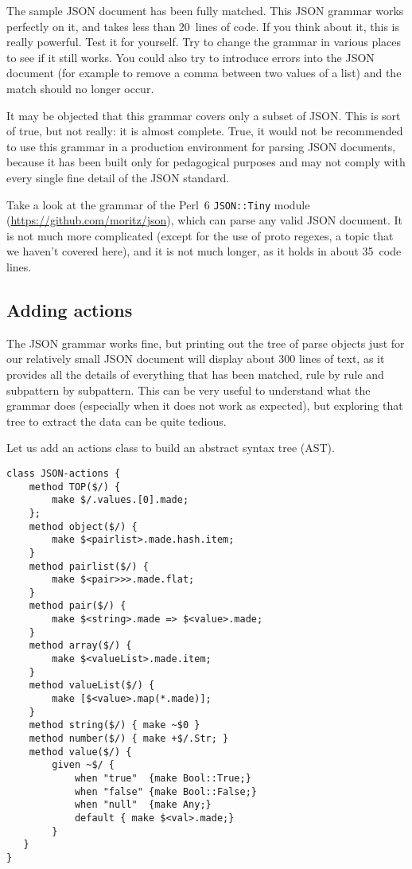The sample JSON document has been fully matched. This 
JSON grammar works perfectly on it, and takes less than 
20~lines of code. If you think about it, this is 
really powerful. Test it for yourself. Try to change 
the grammar in various places to see if it still works. 
You could also try to introduce errors into the JSON 
document (for example to remove a comma between two values 
of a list) and the match should no longer occur.

It may be objected that this grammar covers only a subset 
of JSON. This is sort of true, but not really: it is almost complete. 
True, it would not be recommended to use this grammar 
in a production environment for parsing JSON documents, 
because it has been built only for pedagogical purposes 
and may not comply with every single fine detail of the JSON 
standard.

Take a look at the grammar of the Perl~6 {\tt JSON::Tiny} 
module (\url{https://github.com/moritz/json}), which can 
parse any valid JSON document. It is not much more 
complicated (except for the use of proto regexes, a topic 
that we haven't covered here), and it is not much longer, 
as it holds in about 35~code lines.

\subsection{Adding actions}

The JSON grammar works fine, but printing out the tree of 
parse objects just for our relatively small JSON document 
will display about 300 lines of text, as 
it provides all the details of everything that has been 
matched, rule by rule and subpattern by subpattern. This 
can be very useful to understand what the grammar does 
(especially when it does not work as expected), but 
exploring that tree to extract the data can be quite tedious.

Let us add an actions class to build an abstract syntax tree 
(AST).

\begin{verbatim}
class JSON-actions {
    method TOP($/) {
        make $/.values.[0].made;
    };
    method object($/) {
        make $<pairlist>.made.hash.item;
    }
    method pairlist($/) {
        make $<pair>>>.made.flat;
    }
    method pair($/) {
        make $<string>.made => $<value>.made;
    }
    method array($/) {
        make $<valueList>.made.item;
    }
    method valueList($/) {
        make [$<value>.map(*.made)];
    }
    method string($/) { make ~$0 }
    method number($/) { make +$/.Str; }
    method value($/) { 
        given ~$/ {
            when "true"  {make Bool::True;}
            when "false" {make Bool::False;}
            when "null"  {make Any;}
            default { make $<val>.made;}
        }  
   }
}
\end{verbatim}

